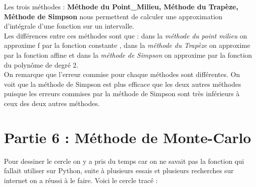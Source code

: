 \documentclass{article}
\begin{document}
Les trois méthodes : \textbf {Méthode du Point\_Milieu, Méthode du Trapèze, Méthode de Simpson} nous permettent de calculer une approximation d'intégrale d'une fonction sur un intervalle. 
\\

	
	Les différences entre ces méthodes sont que : dans la \textit{méthode du point milieu} on approxime f par la fonction constante , dans la \textit{méthode du Trapèze} on approxime par la fonction affine et dans la \textit{méthode de Simpson} on approxime par la fonction du polynôme de degré 2. 
\\

	On remarque que l'erreur commise pour chaque méthodes sont différentes. On voit que la méthode de Simpson est plus efficace que les deux autres méthodes puisque les erreurs commises par la méthode de Simpson sont très inférieurs à ceux des deux autres méthodes.


\section{Partie 6 : Méthode de Monte-Carlo}

Pour dessiner le cercle on y a pris du temps car on ne savait pas la fonction qui fallait utiliser sur Python, suite à plusieurs essais et plusieurs recherches sur internet on a réussi à le faire. Voici le cercle tracé :
\end{document}
